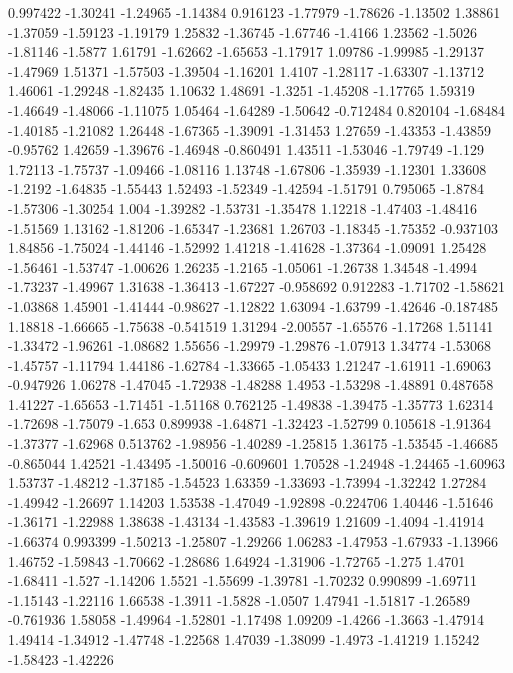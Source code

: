 \documentclass[9pt]{article}
\theoremstyle{plain}
\theoremstyle{definition}
\theoremstyle{remark}
\numberwithin{equation}{section}
\begin{document}
0.997422
-1.30241
-1.24965
-1.14384
0.916123
-1.77979
-1.78626
-1.13502
1.38861
-1.37059
-1.59123
-1.19179
1.25832
-1.36745
-1.67746
-1.4166
1.23562
-1.5026
-1.81146
-1.5877
1.61791
-1.62662
-1.65653
-1.17917
1.09786
-1.99985
-1.29137
-1.47969
1.51371
-1.57503
-1.39504
-1.16201
1.4107
-1.28117
-1.63307
-1.13712
1.46061
-1.29248
-1.82435
1.10632
1.48691
-1.3251
-1.45208
-1.17765
1.59319
-1.46649
-1.48066
-1.11075
1.05464
-1.64289
-1.50642
-0.712484
0.820104
-1.68484
-1.40185
-1.21082
1.26448
-1.67365
-1.39091
-1.31453
1.27659
-1.43353
-1.43859
-0.95762
1.42659
-1.39676
-1.46948
-0.860491
1.43511
-1.53046
-1.79749
-1.129
1.72113
-1.75737
-1.09466
-1.08116
1.13748
-1.67806
-1.35939
-1.12301
1.33608
-1.2192
-1.64835
-1.55443
1.52493
-1.52349
-1.42594
-1.51791
0.795065
-1.8784
-1.57306
-1.30254
1.004
-1.39282
-1.53731
-1.35478
1.12218
-1.47403
-1.48416
-1.51569
1.13162
-1.81206
-1.65347
-1.23681
1.26703
-1.18345
-1.75352
-0.937103
1.84856
-1.75024
-1.44146
-1.52992
1.41218
-1.41628
-1.37364
-1.09091
1.25428
-1.56461
-1.53747
-1.00626
1.26235
-1.2165
-1.05061
-1.26738
1.34548
-1.4994
-1.73237
-1.49967
1.31638
-1.36413
-1.67227
-0.958692
0.912283
-1.71702
-1.58621
-1.03868
1.45901
-1.41444
-0.98627
-1.12822
1.63094
-1.63799
-1.42646
-0.187485
1.18818
-1.66665
-1.75638
-0.541519
1.31294
-2.00557
-1.65576
-1.17268
1.51141
-1.33472
-1.96261
-1.08682
1.55656
-1.29979
-1.29876
-1.07913
1.34774
-1.53068
-1.45757
-1.11794
1.44186
-1.62784
-1.33665
-1.05433
1.21247
-1.61911
-1.69063
-0.947926
1.06278
-1.47045
-1.72938
-1.48288
1.4953
-1.53298
-1.48891
0.487658
1.41227
-1.65653
-1.71451
-1.51168
0.762125
-1.49838
-1.39475
-1.35773
1.62314
-1.72698
-1.75079
-1.653
0.899938
-1.64871
-1.32423
-1.52799
0.105618
-1.91364
-1.37377
-1.62968
0.513762
-1.98956
-1.40289
-1.25815
1.36175
-1.53545
-1.46685
-0.865044
1.42521
-1.43495
-1.50016
-0.609601
1.70528
-1.24948
-1.24465
-1.60963
1.53737
-1.48212
-1.37185
-1.54523
1.63359
-1.33693
-1.73994
-1.32242
1.27284
-1.49942
-1.26697
1.14203
1.53538
-1.47049
-1.92898
-0.224706
1.40446
-1.51646
-1.36171
-1.22988
1.38638
-1.43134
-1.43583
-1.39619
1.21609
-1.4094
-1.41914
-1.66374
0.993399
-1.50213
-1.25807
-1.29266
1.06283
-1.47953
-1.67933
-1.13966
1.46752
-1.59843
-1.70662
-1.28686
1.64924
-1.31906
-1.72765
-1.275
1.4701
-1.68411
-1.527
-1.14206
1.5521
-1.55699
-1.39781
-1.70232
0.990899
-1.69711
-1.15143
-1.22116
1.66538
-1.3911
-1.5828
-1.0507
1.47941
-1.51817
-1.26589
-0.761936
1.58058
-1.49964
-1.52801
-1.17498
1.09209
-1.4266
-1.3663
-1.47914
1.49414
-1.34912
-1.47748
-1.22568
1.47039
-1.38099
-1.4973
-1.41219
1.15242
-1.58423
-1.42226
\end{document}
